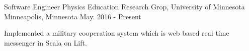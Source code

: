 

\begin{cventries}

  \cventry
    {Software Engineer} %
    {Physics Education Research Grop, University of Minnesota} %
    {Minneapolis, Minnesota} %
    {May. 2016 - Present} %
    {
      \begin{cvitems} %
        \item {Implemented a military cooperation system which is web based real time messenger in Scala on Lift.}
      \end{cvitems}
    }

\end{cventries}
